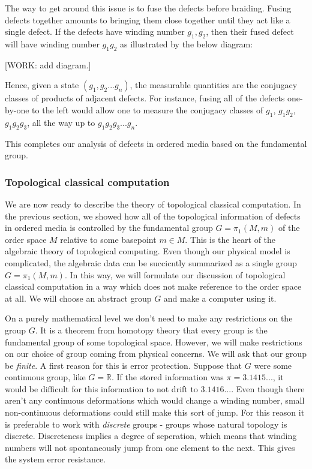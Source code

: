 \documentclass{article}
\theoremstyle{definition}
\newcommand{\RR}{\mathbb{R}}
\newcommand{\0}{\left|0\right>}
\newcommand{\1}{\left|1\right>}
\numberwithin{figure}{section}
\begin{document}
The way to get around this issue is to fuse the defects before braiding. Fusing defects together amounts to bringing them close together until they act like a single defect. If the defects have winding number $g_1,g_2$, then their fused defect will have winding number $g_1g_2$ as illustrated by the below diagram:

[WORK: add diagram.]

Hence, given a state $(g_1,g_2... g_n)$, the measurable quantities are the conjugacy classes of products of adjacent defects. For instance, fusing all of the defects one-by-one to the left would allow one to measure the conjugacy classes of $g_1$, $g_1g_2$, $g_1g_2g_3$, all the way up to $g_1g_2g_3...g_n$.

This completes our analysis of defects in ordered media based on the fundamental group.

\subsubsection{Topological classical computation}

We are now ready to describe the theory of topological classical computation. In the previous section, we showed how all of the topological information of defects in ordered media is controlled by the fundamental group $G=\pi_1(M,m)$ of the order space $M$ relative to some basepoint $m\in M$. This is the heart of the algebraic theory of topological computing. Even though our physical model is complicated, the algebraic data can be succicntly summarized as a single group $G=\pi_1(M,m)$. In this way, we will formulate our discussion of topological classical computation in a way which does not make reference to the order space at all. We will choose an abstract group $G$ and make a computer using it.

On a purely mathematical level we don't need to make any restrictions on the group $G$. It is a theorem from homotopy theory that every group is the fundamental group of some topological space. However, we will make restrictions on our choice of group coming from physical concerns. We will ask that our group be \textit{finite}. A first reason for this is error protection. Suppose that $G$ were some continuous group, like $G=\RR$. If the stored information was $\pi=3.1415...$, it would be difficult for this information to not drift to $3.1416...$. Even though there aren't any continuous deformations which would change a winding number, small non-continuous deformations could still make this sort of jump. For this reason it is preferable to work with \textit{discrete} groups - groups whose natural topology is discrete. Discreteness implies a degree of seperation, which means that winding numbers will not spontaneously jump from one element to the next. This gives the system error resistance.
\end{document}
